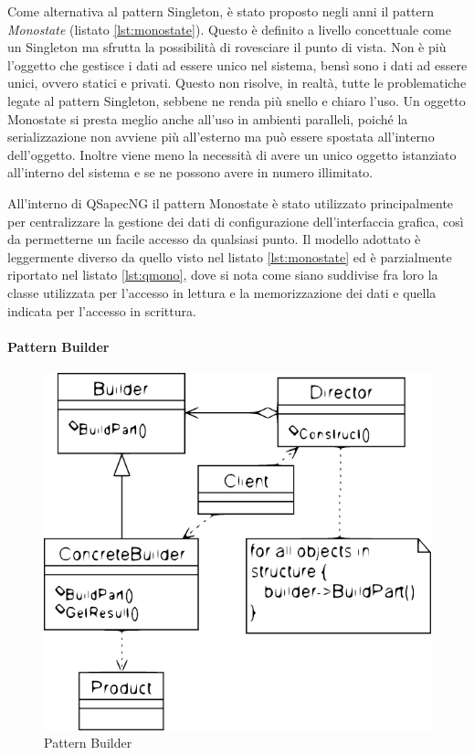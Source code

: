 Come alternativa al pattern Singleton, è stato proposto negli anni il pattern \textit{Monostate} (listato \ref{lst:monostate}). Questo è definito a livello concettuale come un Singleton ma sfrutta la possibilità di rovesciare il punto di vista. Non è più l'oggetto che gestisce i dati ad essere unico nel sistema, bensì sono i dati ad essere unici, ovvero statici e privati. Questo non risolve, in realtà, tutte le problematiche legate al pattern Singleton, sebbene ne renda più snello e chiaro l'uso. Un oggetto Monostate si presta meglio anche all'uso in ambienti paralleli, poiché la serializzazione non avviene più all'esterno ma può essere spostata all'interno dell'oggetto. Inoltre viene meno la necessità di avere un unico oggetto istanziato all'interno del sistema e se ne possono avere in numero illimitato.

All'interno di QSapecNG il pattern Monostate è stato utilizzato principalmente per centralizzare la gestione dei dati di configurazione dell'interfaccia grafica, così da permetterne un facile accesso da qualsiasi punto. Il modello adottato è leggermente diverso da quello visto nel listato \ref{lst:monostate} ed è parzialmente riportato nel listato \ref{lst:qmono}, dove si nota come siano suddivise fra loro la classe utilizzata per l'accesso in lettura e la memorizzazione dei dati e quella indicata per l'accesso in scrittura.

\paragraph{Pattern Builder}

\begin{figure}[ht]
 \centering
 \includegraphics[scale=0.80]{immagini/builder.pdf}
 \caption{Pattern Builder}
 \label{fig:builder}
\end{figure}

